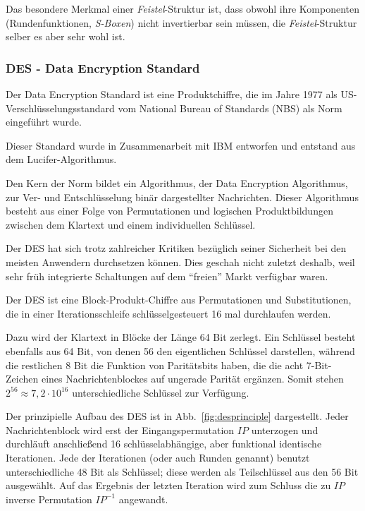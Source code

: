
Das besondere Merkmal einer \textit{Feistel}-Struktur ist, dass obwohl ihre Komponenten (Rundenfunktionen, \textit{S-Boxen}) nicht invertierbar sein müssen, die \textit{Feistel}-Struktur selber es aber sehr wohl ist.

\subsubsection{DES - Data Encryption Standard}
\label{sssec:des}
Der Data Encryption Standard ist eine Produktchiffre, die im Jahre 1977 als US-Ver\-schlüs\-sel\-ungs\-stan\-dard vom National Bureau of Standards (NBS) als
Norm eingeführt wurde.

Dieser Standard wurde in Zusammenarbeit mit IBM entworfen und entstand aus dem Lucifer-Algorithmus.

Den Kern der Norm bildet ein Algorithmus, der Data Encryption Algorithmus, zur Ver- und Entschlüsselung binär dargestellter Nachrichten. Dieser Algorithmus
besteht aus einer Folge von Permutationen und logischen Produktbildungen zwischen dem Klartext und einem individuellen Schlüssel.

Der DES hat sich trotz zahlreicher Kritiken bezüglich seiner Sicherheit bei den meisten Anwendern durchsetzen können. Dies geschah nicht zuletzt deshalb, weil
sehr früh integrierte Schaltungen auf dem "`freien"' Markt verfügbar waren.

Der DES ist eine Block-Produkt-Chiffre aus Permutationen und Substitutionen, die in einer Iterationsschleife schlüsselgesteuert 16 mal durchlaufen werden.

Dazu wird der Klartext in Blöcke der Länge 64 Bit zerlegt. Ein Schlüssel besteht ebenfalls aus 64 Bit, von denen 56 den eigentlichen Schlüssel darstellen,
während die restlichen 8 Bit die Funktion von Paritätsbits haben, die die acht 7-Bit-Zeichen eines Nachrichtenblockes auf ungerade Parität ergänzen. Somit
stehen $2^{56}\approx 7,2\cdot 10^{16}$ unterschiedliche Schlüssel zur Verfügung.

Der prinzipielle Aufbau des DES ist in Abb.~\ref{fig:desprinciple} dargestellt. Jeder Nachrichtenblock wird erst der Eingangspermutation $IP$ unterzogen und
durchläuft anschließend 16 schlüsselabhängige, aber funktional identische Iterationen. Jede der Iterationen (oder auch Runden genannt) benutzt unterschiedliche
48 Bit als Schlüssel; diese werden als Teilschlüssel aus den 56 Bit ausgewählt. Auf das Ergebnis der letzten Iteration wird zum Schluss die zu $IP$
inverse Permutation $IP^{-1}$ angewandt.


